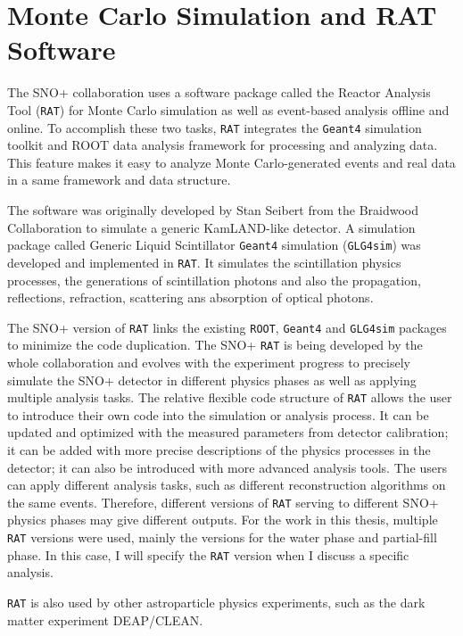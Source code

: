\section{Monte Carlo Simulation and RAT Software}\label{sect:rat}
The SNO+ collaboration uses a software package called the Reactor Analysis Tool (\texttt{RAT}) for Monte Carlo simulation as well as event-based analysis offline and online. To accomplish these two tasks, \texttt{RAT} integrates the \texttt{Geant4} simulation toolkit\cite{agostinelli2003geant4} and ROOT data analysis framework\cite{brunroot} for processing and analyzing data. This feature makes it easy to analyze Monte Carlo-generated events and real data in a same framework and data structure.

The software was originally developed by Stan Seibert from the Braidwood Collaboration to simulate a generic KamLAND-like detector\cite{ratManual}. A simulation package called Generic Liquid Scintillator \texttt{Geant4} simulation (\texttt{GLG4sim}) was developed and implemented in \texttt{RAT}\cite{horton2006introduction}. It simulates the scintillation physics processes, the generations of scintillation photons and also the propagation, reflections, refraction, scattering ans absorption of optical photons\cite{dunger2018topological}.

The SNO+ version of \texttt{RAT} links the existing \texttt{ROOT}, \texttt{Geant4} and \texttt{GLG4sim} packages to minimize the code duplication. The SNO+ \texttt{RAT} is being developed by the whole collaboration and evolves with the experiment progress to precisely simulate the SNO+ detector in different physics phases as well as applying multiple analysis tasks. The relative flexible code structure of \texttt{RAT} allows the user to introduce their own code into the simulation or analysis process\cite{ratManual}. It can be updated and optimized with the measured parameters from detector calibration; it can be added with more precise descriptions of the physics processes in the detector; it can also be introduced with more advanced analysis tools. The users can apply different analysis tasks, such as different reconstruction algorithms on the same events\cite{ratManual}. Therefore, different versions of \texttt{RAT} serving to different SNO+ physics phases may give different outputs. For the work in this thesis, multiple \texttt{RAT} versions were used, mainly the versions for the water phase and partial-fill phase. In this case, I will specify the \texttt{RAT} version when I discuss a specific analysis.

\texttt{RAT} is also used by other astroparticle physics experiments, such as the dark matter experiment DEAP/CLEAN\cite{caldwell2014simulation}. 
